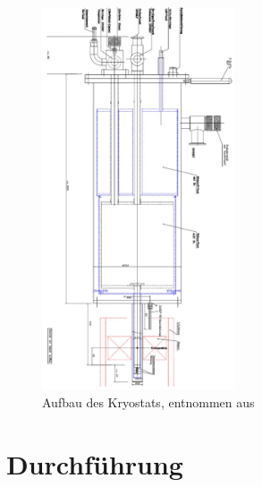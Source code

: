 \documentclass[german,  %
parskip=full,  %
]{scrartcl}
\begin{document}
\begin{figure}[h!]
\centering
\includegraphics[width=0.51\textwidth]{kryo}
\caption{Aufbau des Kryostats, entnommen aus \cite{3}}
\end{figure}
\newpage
\section{Durchführung}
\end{document}
